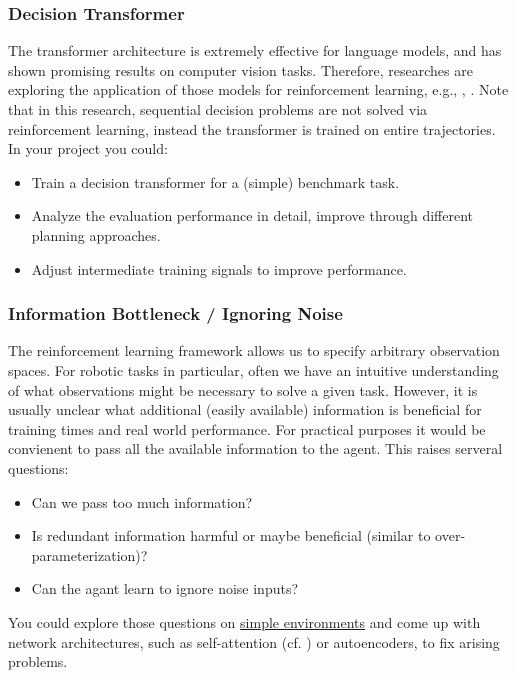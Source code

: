 \documentclass[a4paper]{article}
\begin{document}
\subsubsection{Decision Transformer}
The transformer architecture is extremely effective for language models, and has shown promising results on computer vision tasks.
Therefore, researches are exploring the application of those models for reinforcement learning, e.g., \citet{DecisionTransformer2021}, \citet{Kuang-Huei2022}. Note that in this research, sequential decision problems are not solved via reinforcement learning, instead the transformer is trained on entire trajectories.
In your project you could:
\begin{itemize}
  \item Train a decision transformer for a (simple) benchmark task.
  \item Analyze the evaluation performance in detail, improve through different planning approaches.
  \item Adjust intermediate training signals to improve performance.
\end{itemize}

\subsubsection{Information Bottleneck / Ignoring Noise}
The reinforcement learning framework allows us to specify arbitrary observation spaces.
For robotic tasks in particular, often we have an intuitive understanding of what observations might be necessary to solve a given task.
However, it is usually unclear what additional (easily available) information is beneficial for training times and real world performance.
For practical purposes it would be convienent to pass all the available information to the agent.
This raises serveral questions:
\begin{itemize}
  \item Can we pass too much information?
  \item Is redundant information harmful or maybe beneficial (similar to over-parameterization)?
  \item Can the agant learn to ignore noise inputs?
\end{itemize}
You could explore those questions on \href{https://gymnasium.farama.org/environments/mujoco/}{simple environments} and come up with network architectures, such as self-attention (cf. \citet{Tang2020}) or autoencoders, to fix arising problems.
\end{document}
